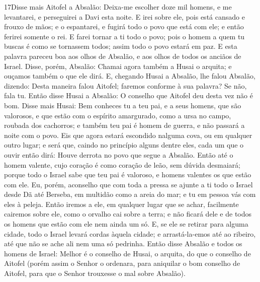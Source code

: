 \medskip

\lettrine{17} Disse mais Aitofel a Absalão: Deixa-me escolher
doze mil homens, e me levantarei, e perseguirei a Davi esta noite.
E irei sobre ele, pois está cansado e frouxo de mãos; e o
espantarei, e fugirá todo o povo que está com ele; e então ferirei
somente o rei. E farei tornar a ti todo o povo; pois o homem a
quem tu buscas é como se tornassem todos; assim todo o povo estará
em paz. E esta palavra pareceu boa aos olhos de Absalão, e aos
olhos de todos os anciãos de Israel. Disse, porém, Absalão:
Chamai agora também a Husai o arquita; e ouçamos também o que ele
dirá. E, chegando Husai a Absalão, lhe falou Absalão, dizendo:
Desta maneira falou Aitofel; faremos conforme à sua palavra? Se não,
fala tu. Então disse Husai a Absalão: O conselho que Aitofel deu
desta vez não é bom. Disse mais Husai: Bem conheces tu a teu
pai, e a seus homens, que são valorosos, e que estão com o espírito
amargurado, como a ursa no campo, roubada dos cachorros; e também
teu pai é homem de guerra, e não passará a noite com o povo. Eis
que agora estará escondido nalguma cova, ou em qualquer outro lugar;
e será que, caindo no princípio alguns dentre eles, cada um que o
ouvir então dirá: Houve derrota no povo que segue a Absalão.
Então até o homem valente, cujo coração é como coração de
leão, sem dúvida desmaiará; porque todo o Israel sabe que teu pai é
valoroso, e homens valentes os que estão com ele. Eu, porém,
aconselho que com toda a pressa se ajunte a ti todo o Israel desde
Dã até Berseba, em multidão como a areia do mar; e tu em pessoa vás
com eles à peleja. Então iremos a ele, em qualquer lugar que
se achar, facilmente cairemos sobre ele, como o orvalho cai sobre a
terra; e não ficará dele e de todos os homens que estão com ele nem
ainda um só. E, se ele se retirar para alguma cidade, todo o
Israel levará cordas àquela cidade; e arrastá-la-emos até ao
ribeiro, até que não se ache ali nem uma só pedrinha. Então
disse Absalão e todos os homens de Israel: Melhor é o conselho de
Husai, o arquita, do que o conselho de Aitofel (porém assim o Senhor
o ordenara, para aniquilar o bom conselho de Aitofel, para que o
Senhor trouxesse o mal sobre Absalão).

